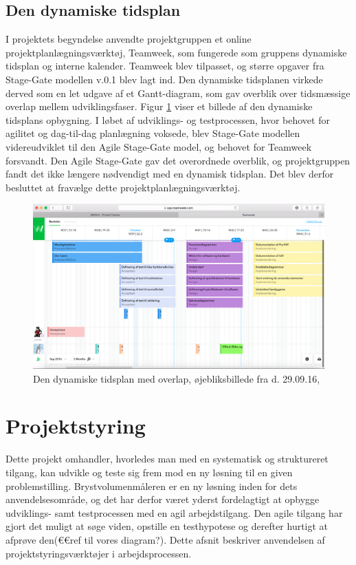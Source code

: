 \subsection{Den dynamiske tidsplan} 
I projektets begyndelse anvendte projektgruppen et online projektplanlægningsværktøj, Teamweek, som fungerede som gruppens dynamiske tidsplan og interne kalender. Teamweek blev tilpasset, og større opgaver fra Stage-Gate modellen v.0.1 blev lagt ind. Den dynamiske tidsplanen virkede derved som en let udgave af et Gantt-diagram, som gav overblik over tidsmæssige overlap mellem udviklingsfaser. Figur \ref{fig:teamweek} viser et billede af den dynamiske tidsplans opbygning. I løbet af udviklings- og testprocessen, hvor behovet for agilitet og dag-til-dag planlægning voksede, blev Stage-Gate modellen videreudviklet til den Agile Stage-Gate model, og behovet for Teamweek forsvandt. Den Agile Stage-Gate gav det overordnede overblik, og projektgruppen fandt det ikke længere nødvendigt med en dynamisk tidsplan. Det blev derfor besluttet at fravælge dette projektplanlægningsværktøj.  

\begin{figure}[htb]
\centering
\includegraphics[width=5in]{teamweek.png}	
\caption{Den dynamiske tidsplan med overlap, øjebliksbillede fra d. 29.09.16,}
\label{fig:teamweek}
\end{figure}

\section{Projektstyring}
Dette projekt omhandler, hvorledes man med en systematisk og struktureret tilgang, kan udvikle og teste sig frem mod en ny løsning til en given problemstilling. Brystvolumenmåleren er en ny løsning inden for dets anvendelsesområde, og det har derfor været yderst fordelagtigt at opbygge udviklings- samt testprocessen med en agil arbejdstilgang. Den agile tilgang har gjort det muligt at søge viden, opstille en testhypotese og derefter hurtigt at afprøve den(€€ref til vores diagram?). Dette afsnit beskriver anvendelsen af projektstyringsværktøjer i arbejdsprocessen. 
	

